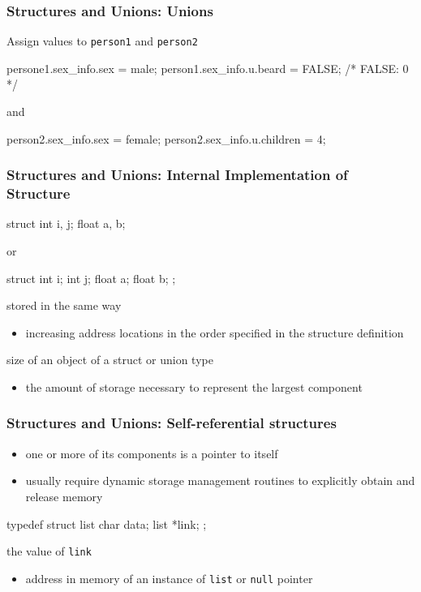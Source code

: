 \documentclass[newPxFont,sthlmFooter,nooffset]{beamer}
\begin{document}
\begin{frame}[t, fragile]
  \frametitle{Structures and Unions: Unions}
Assign values to \texttt{person1} and \texttt{person2}
\begin{codedef}
persone1.sex_info.sex = male; 
person1.sex_info.u.beard = FALSE; /* FALSE: 0 */
\end{codedef}

and

\begin{codedef}
person2.sex_info.sex = female; 
person2.sex_info.u.children = 4;
\end{codedef}
\end{frame}

\begin{frame}[t, fragile]
  \frametitle{Structures and Unions: {\large Internal Implementation of Structure}}
\begin{codedef}
struct {
    int i, j; float a, b;
}  
\end{codedef}

or 
\begin{codedef}
struct {
    int i; int j; float a; float b;
};
\end{codedef}
\bigskip
stored in the same way
\begin{itemize}
\item increasing address locations in the order specified in the
  structure definition
\end{itemize}

size of an object of a struct or union type
\begin{itemize}
\item the amount of storage necessary to represent the largest
  component
\end{itemize}

\end{frame}

\begin{frame}[t, fragile]
  \frametitle{Structures and Unions: {\large Self-referential structures}}
  \begin{itemize}
  \item one or more of its components is a pointer to itself
  \item usually require dynamic storage management routines to
    explicitly obtain and release memory
  \end{itemize}
\begin{codedef}
typedef struct list {
    char data;
    list *link;
};    
\end{codedef}
the value of \texttt{link}
\begin{itemize}
\item address in memory of an instance of \texttt{list} or \texttt{null} pointer
\end{itemize}
\end{frame}
\end{document}
